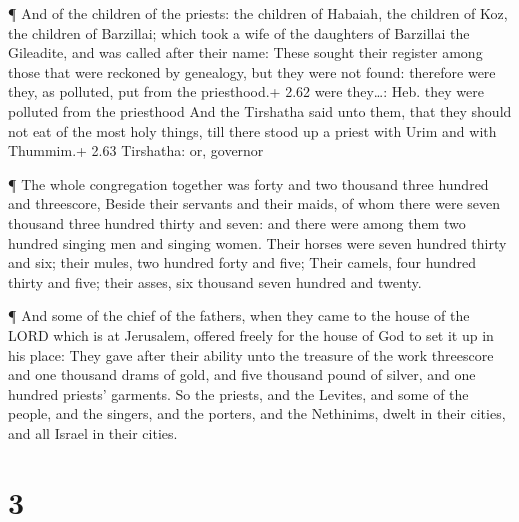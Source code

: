  ¶ And of the children of the priests: the children of
Habaiah, the children of Koz, the children of Barzillai; which took a
wife of the daughters of Barzillai the Gileadite, and was called after
their name:  These sought their register among those that
were reckoned by genealogy, but they were not found: therefore were
they, as polluted, put from the priesthood.+ 2.62 were they\ldots: Heb.
they were polluted from the priesthood  And the Tirshatha
said unto them, that they should not eat of the most holy things, till
there stood up a priest with Urim and with Thummim.+ 2.63 Tirshatha: or,
governor

 ¶ The whole congregation together was forty and two
thousand three hundred and threescore,  Beside their
servants and their maids, of whom there were seven thousand three
hundred thirty and seven: and there were among them two hundred singing
men and singing women.  Their horses were seven hundred
thirty and six; their mules, two hundred forty and five; 
Their camels, four hundred thirty and five; their asses, six thousand
seven hundred and twenty.

 ¶ And some of the chief of the fathers, when they came to
the house of the LORD which is at Jerusalem, offered freely for the
house of God to set it up in his place:  They gave after
their ability unto the treasure of the work threescore and one thousand
drams of gold, and five thousand pound of silver, and one hundred
priests' garments.  So the priests, and the Levites, and
some of the people, and the singers, and the porters, and the Nethinims,
dwelt in their cities, and all Israel in their cities.

\hypertarget{section-2}{%
\section{3}\label{section-2}}

